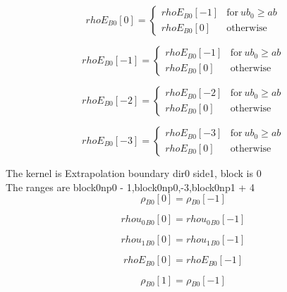 \documentclass{article}
\begin{document}
\begin{dmath}{rhoE{_{B0}}}[{0}] = \begin{cases} {rhoE{_{B0}}}[{-1}] & \text{for}\: ub_{0} \geq ab \\{rhoE{_{B0}}}[{0}] & \text{otherwise} \end{cases}\end{dmath}

\begin{dmath}{rhoE{_{B0}}}[{-1}] = \begin{cases} {rhoE{_{B0}}}[{-1}] & \text{for}\: ub_{0} \geq ab \\{rhoE{_{B0}}}[{0}] & \text{otherwise} \end{cases}\end{dmath}

\begin{dmath}{rhoE{_{B0}}}[{-2}] = \begin{cases} {rhoE{_{B0}}}[{-2}] & \text{for}\: ub_{0} \geq ab \\{rhoE{_{B0}}}[{0}] & \text{otherwise} \end{cases}\end{dmath}

\begin{dmath}{rhoE{_{B0}}}[{-3}] = \begin{cases} {rhoE{_{B0}}}[{-3}] & \text{for}\: ub_{0} \geq ab \\{rhoE{_{B0}}}[{0}] & \text{otherwise} \end{cases}\end{dmath}

\noindent The kernel is Extrapolation boundary dir0 side1, block is 0\\\noindent The ranges are block0np0 - 1,block0np0,-3,block0np1 + 4\\\begin{dmath}{\rho{_{B0}}}[{0}] = {\rho{_{B0}}}[{-1}]\end{dmath}

\begin{dmath}{rhou_{0}{_{B0}}}[{0}] = {rhou_{0}{_{B0}}}[{-1}]\end{dmath}

\begin{dmath}{rhou_{1}{_{B0}}}[{0}] = {rhou_{1}{_{B0}}}[{-1}]\end{dmath}

\begin{dmath}{rhoE{_{B0}}}[{0}] = {rhoE{_{B0}}}[{-1}]\end{dmath}

\begin{dmath}{\rho{_{B0}}}[{1}] = {\rho{_{B0}}}[{-1}]\end{dmath}
\end{document}
